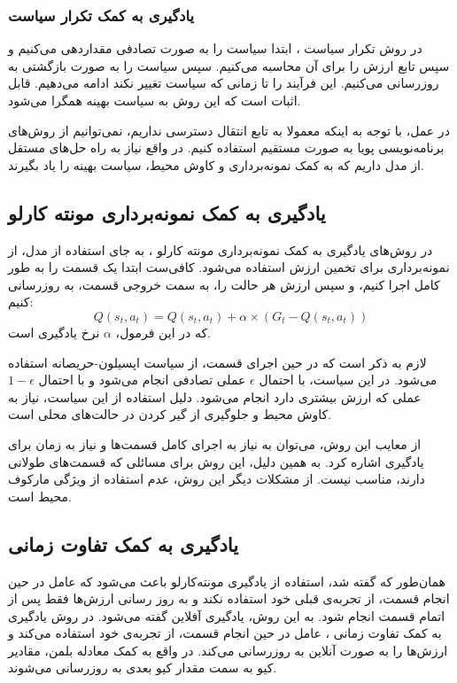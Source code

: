 \subsubsection{یادگیری به کمک تکرار سیاست}
در روش تکرار سیاست ،
ابتدا سیاست را به صورت تصادفی مقداردهی می‌کنیم و سپس تابع ارزش را برای آن محاسبه می‌کنیم.
سپس سیاست را به صورت بازگشتی به روزرسانی می‌کنیم. 
این فرآیند را تا زمانی که سیاست تغییر نکند ادامه می‌دهیم.
قابل اثبات است که این روش به سیاست بهینه همگرا می‌شود.

در عمل، با توجه به اینکه معمولا به تابع انتقال دسترسی نداریم، نمی‌توانیم از روش‌های برنامه‌نویسی پویا به صورت مستقیم استفاده کنیم.
در واقع نیاز به راه حل‌های مستقل از مدل داریم که به کمک نمونه‌برداری و کاوش محیط، سیاست بهینه را یاد بگیرند.

\subsection{یادگیری به کمک نمونه‌برداری مونته کارلو}
در روش‌های یادگیری به کمک نمونه‌برداری مونته کارلو ،
به جای استفاده از مدل، از نمونه‌برداری برای تخمین ارزش استفاده می‌شود.
کافی‌ست ابتدا یک قسمت را به طور کامل اجرا کنیم، و سپس ارزش هر حالت را، به سمت خروجی قسمت، به روزرسانی کنیم:
\begin{equation}\label{eq:mc_q_function}
    Q(s_t, a_t) = Q(s_t, a_t) + \alpha \times (G_t - Q(s_t, a_t))
\end{equation}
که در این فرمول، $\alpha$
نرخ یادگیری  است.

لازم به ذکر است که در حین اجرای قسمت، از سیاست اپسیلون-حریصانه  استفاده می‌شود.
در این سیاست، با احتمال $\epsilon$ عملی تصادفی انجام می‌شود و با احتمال $1-\epsilon$ عملی که ارزش بیشتری دارد انجام می‌شود.
دلیل استفاده از این سیاست، نیاز به کاوش محیط و جلوگیری از گیر کردن در حالت‌های محلی است.

از معایب این روش، می‌توان به نیاز به اجرای کامل قسمت‌ها و نیاز به زمان برای یادگیری اشاره کرد. به همین دلیل، این روش برای مسائلی که قسمت‌های طولانی دارند، مناسب نیست.
از مشکلات دیگر این روش، عدم استفاده از ویژگی مارکوف محیط است.
\subsection{یادگیری به کمک تفاوت زمانی}
همان‌طور که گفته شد، استفاده از یادگیری مونته‌کارلو باعث می‌شود که عامل در حین انجام قسمت، از تجربه‌ی قبلی خود استفاده نکند
و به روز رسانی ارزش‌ها فقط پس از اتمام قسمت انجام شود. به این روش، یادگیری آفلاین  گفته می‌شود.
در روش یادگیری به کمک تفاوت زمانی ،
عامل در حین انجام قسمت، از تجربه‌ی خود استفاده می‌کند و ارزش‌ها را به صورت آنلاین به روزرسانی می‌کند.
در واقع به کمک معادله بلمن، مقادیر کیو به سمت مقدار کیو بعدی به روزرسانی می‌شوند.

